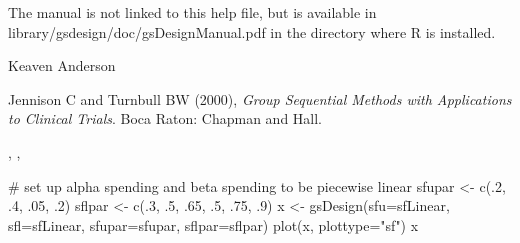 \begin{Note}\relax
The manual is not linked to this help file, but is available in library/gsdesign/doc/gsDesignManual.pdf
in the directory where R is installed.
\end{Note}
\begin{Author}\relax
Keaven Anderson 
\end{Author}
\begin{References}\relax
Jennison C and Turnbull BW (2000), \emph{Group Sequential Methods with Applications to Clinical Trials}.
Boca Raton: Chapman and Hall.
\end{References}
\begin{SeeAlso}\relax
{}, , 
\end{SeeAlso}
\begin{Examples}
\begin{ExampleCode}
# set up alpha spending and beta spending to be piecewise linear
sfupar <- c(.2, .4, .05, .2)
sflpar <- c(.3, .5, .65, .5, .75, .9)
x <- gsDesign(sfu=sfLinear, sfl=sfLinear, sfupar=sfupar, sflpar=sflpar)
plot(x, plottype="sf")
x

\end{ExampleCode}
\end{Examples}

